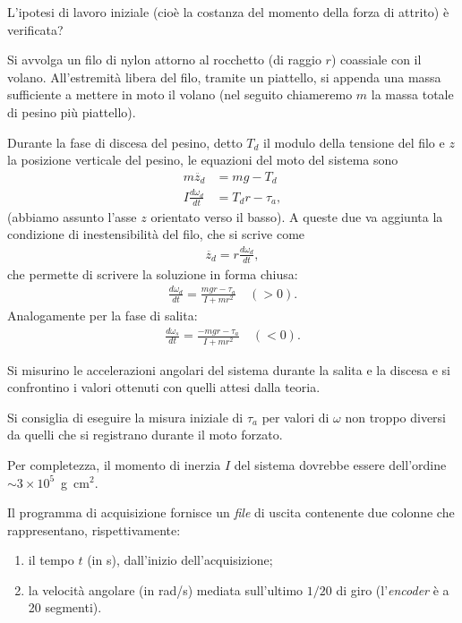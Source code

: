 \documentclass{lab1-article}
\begin{document}
\begin{article}
L'ipotesi di lavoro iniziale (cio\`e la costanza del momento della forza
di attrito) \`e verificata?



Si avvolga un filo di nylon attorno al rocchetto (di raggio $r$) coassiale con
il volano. All'estremit\`a libera del filo, tramite un piattello, si appenda
una massa sufficiente a mettere in moto il volano (nel seguito chiameremo
$m$ la massa totale di pesino pi\`u piattello).

Durante la fase di discesa del pesino, detto $T_d$ il modulo della tensione del
filo e $z$ la posizione verticale del pesino, le equazioni del moto del
sistema sono
\begin{align}
  m\ddot{z_d} &= mg - T_d\\
  I \frac{d\omega_d}{dt} &= T_dr - \tau_a,
\end{align}
(abbiamo assunto l'asse $z$ orientato verso il basso). A queste due va
aggiunta la condizione di inestensibilit\`a del filo, che si scrive come
\begin{align}
  \ddot{z_d} = r\frac{d\omega_d}{dt},
\end{align}
che permette di scrivere la soluzione in forma chiusa:
\begin{align}
  \frac{d\omega_d}{dt} = \frac{mgr - \tau_a}{I + mr^2} \quad (> 0).
\end{align}
Analogamente per la fase di salita:
\begin{align}
  \frac{d\omega_s}{dt} = \frac{-mgr - \tau_a}{I + mr^2} \quad (<0). 
\end{align}

Si misurino le accelerazioni angolari del sistema durante la salita e la
discesa e si confrontino i valori ottenuti con quelli attesi dalla teoria.


\secconsiderations

Si consiglia di eseguire la misura iniziale di $\tau_a$ per valori di
$\omega$ non troppo diversi da quelli che si registrano durante il moto
forzato.

Per completezza, il momento di inerzia $I$ del sistema dovrebbe essere
dell'ordine $\sim 3 \times 10^5$~g~cm$^2$.


\subsecdataformat

Il programma di acquisizione fornisce un \emph{file} di uscita contenente due
colonne che rappresentano, rispettivamente:
\begin{enumerate}
\item il tempo $t$ (in s), dall'inizio dell'acquisizione;
\item la velocit\`a angolare (in rad/s) mediata sull'ultimo $1/20$ di giro
(l'\emph{encoder} \`e a 20 segmenti).
\end{enumerate}


\plasduinosave

\end{article}
\end{document}

